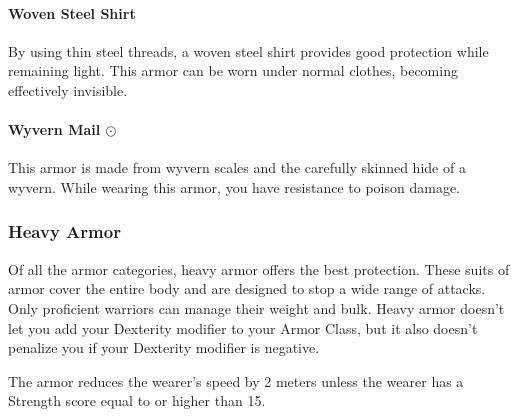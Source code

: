     \paragraph{Woven Steel Shirt}
        By using thin steel threads, a woven steel shirt provides good protection while remaining light.
        This armor can be worn under normal clothes, becoming effectively invisible.
    \paragraph{Wyvern Mail $\odot$}
        This armor is made from wyvern scales and the carefully skinned hide of a wyvern.
        While wearing this armor, you have resistance to poison damage.
\newpage
\subsubsection{Heavy Armor} \label{ssec::heavyarmor}
    Of all the armor categories, heavy armor offers the best protection.
    These suits of armor cover the entire body and are designed to stop a wide range of attacks.
    Only proficient warriors can manage their weight and bulk.
    Heavy armor doesn't let you add your Dexterity modifier to your Armor Class, but it also doesn't penalize you if your Dexterity modifier is negative.

    The armor reduces the wearer's speed by 2 meters unless the wearer has a Strength score equal to or higher than 15.

